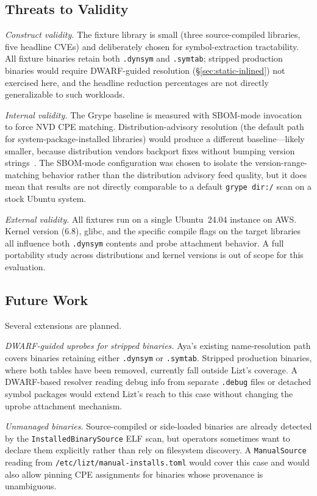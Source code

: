 \documentclass[conference]{IEEEtran}
\begin{document}
\subsection{Threats to Validity}

\emph{Construct validity.} The fixture library is small (three source-compiled libraries, five headline CVEs) and deliberately chosen for symbol-extraction tractability.
All fixture binaries retain both \texttt{.dynsym} and \texttt{.symtab}; stripped production binaries would require DWARF-guided resolution (\S\ref{sec:static-inlined}) not exercised here, and the headline reduction percentages are not directly generalizable to such workloads.

\emph{Internal validity.} The Grype baseline is measured with SBOM-mode invocation to force NVD CPE matching.
Distribution-advisory resolution (the default path for system-package-installed libraries) would produce a different baseline---likely smaller, because distribution vendors backport fixes without bumping version strings~\cite{redhat_backporting}.
The SBOM-mode configuration was chosen to isolate the version-range-matching behavior rather than the distribution advisory feed quality, but it does mean that results are not directly comparable to a default \texttt{grype dir:/} scan on a stock Ubuntu system.

\emph{External validity.} All fixtures run on a single Ubuntu~24.04 instance on AWS.
Kernel version (6.8), glibc, and the specific compile flags on the target libraries all influence both \texttt{.dynsym} contents and probe attachment behavior.
A full portability study across distributions and kernel versions is out of scope for this evaluation.


\subsection{Future Work}
\label{sec:future-work}

Several extensions are planned.

\emph{DWARF-guided uprobes for stripped binaries.} Aya's existing name-resolution path covers binaries retaining either \texttt{.dynsym} or \texttt{.symtab}.
Stripped production binaries, where both tables have been removed, currently fall outside Lizt's coverage.
A DWARF-based resolver reading debug info from separate \texttt{.debug} files or detached symbol packages would extend Lizt's reach to this case without changing the uprobe attachment mechanism.

\emph{Unmanaged binaries.} Source-compiled or side-loaded binaries are already detected by the \texttt{InstalledBinarySource} ELF scan, but operators sometimes want to declare them explicitly rather than rely on filesystem discovery.
A \texttt{ManualSource} reading from \texttt{/etc/lizt/manual-installs.toml} would cover this case and would also allow pinning CPE assignments for binaries whose provenance is unambiguous.
\end{document}
